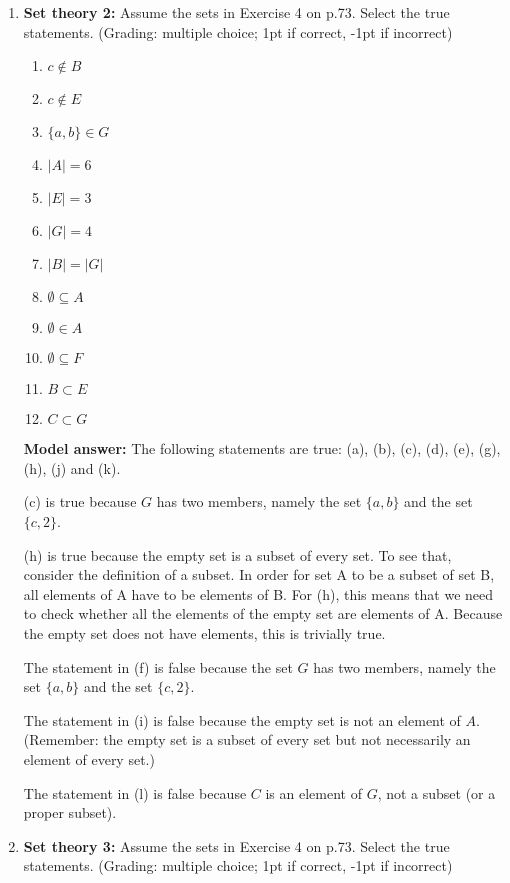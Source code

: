 \documentclass[a4,11pt]{article}
\begin{document}
\begin{enumerate}[leftmargin = 12pt]
\item {\bf Set theory 2:} Assume the sets in Exercise 4 on p.73. Select the true statements. (Grading: multiple choice; 1pt if correct, -1pt if incorrect)

      \begin{enumerate}[noitemsep]
        \item $c \not\in B$
        \item $c \not\in E$
       \item $\{a,b\} \in G$
        \item $|A| = 6$
        \item $|E| = 3$
        \item $|G| = 4$
        \item $|B| = |G|$
	\item $\emptyset \subseteq A$
	\item $\emptyset \in A$
	\item $\emptyset \subseteq F$
	\item $B \subset E$
	\item $C \subset G$
         \end{enumerate}
 
  {\bf Model answer:} The following statements are true: (a), (b), (c), (d), (e), (g), (h), (j) and (k).
  
(c) is true because $G$ has two members, namely the set $\{a,b\}$ and the set $\{c,2\}$.

(h) is true because the empty set is a subset of every set. To see that, consider the definition of a subset. In order for set A to be a subset of set B, all elements of A have to be elements of B. For (h), this means that we need to check whether all the elements of the empty set are elements of A. Because the empty set does not have elements, this is trivially true.
  
The statement in (f) is false because the set $G$ has two members, namely the set $\{a,b\}$ and the set $\{c,2\}$.

The statement in (i) is false because the empty set is not an element of $A$. (Remember: the empty set is a subset of every set but not necessarily an element of every set.)

The statement in (l) is false because $C$ is an element of $G$, not a subset (or a proper subset).

        
\item {\bf Set theory 3:} Assume the sets in Exercise 4 on p.73. Select the true statements. (Grading: multiple choice; 1pt if correct, -1pt if incorrect)
\newpage


\end{enumerate}
\end{document}
